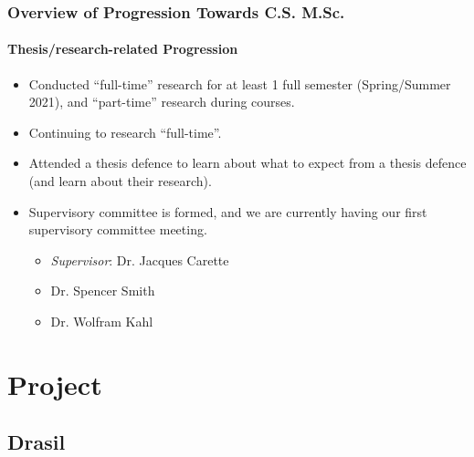 \documentclass{beamer}
\begin{document}
\begin{frame}
    \frametitle{Overview of Progression Towards C.S. M.Sc.}
    \framesubtitle{Thesis/research-related Progression}
    \begin{itemize}
        \item<1-> Conducted ``full-time'' research for at least 1 full semester (Spring/Summer 2021), and ``part-time'' research during courses.
        \item<2-> Continuing to research ``full-time''.
        \item<3-> Attended a thesis defence to learn about what to expect from a thesis defence (and learn about their research).
        \item<4-> Supervisory committee is formed, and we are currently having our first supervisory committee meeting.
            \begin{itemize}
                \item \emph{Supervisor}: Dr. Jacques Carette
                \item Dr. Spencer Smith
                \item Dr. Wolfram Kahl
            \end{itemize}
    \end{itemize}
\end{frame}


\section{Project}
\subsection{Drasil}
\end{document}
